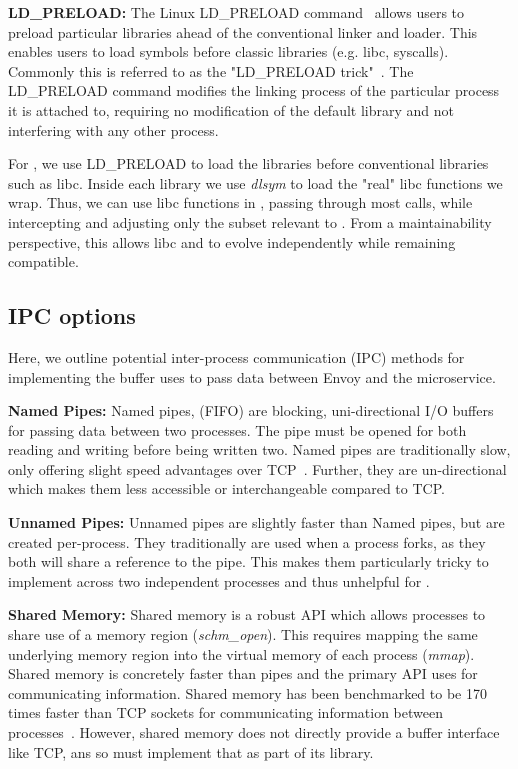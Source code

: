 \textbf{LD\_PRELOAD:}
The Linux LD\_PRELOAD command~\cite{ldpreload} allows users to preload particular libraries ahead of the conventional linker and loader.
This enables users to load symbols before classic libraries (e.g. libc, syscalls).
Commonly this is referred to as the "LD\_PRELOAD trick"~\cite{ldtrick}.
The LD\_PRELOAD command modifies the linking process of the particular process it is attached to, requiring no modification of the default library and not interfering with any other process.


For \sysname, we use LD\_PRELOAD to load the \sysname libraries before conventional libraries such as libc.
Inside each \sysname library we use \textit{dlsym} to load the "real" libc functions we wrap.
Thus, we can use libc functions in \sysname, passing through most calls, while intercepting and adjusting only the subset relevant to \sysname.
From a maintainability perspective, this allows libc and \sysname to evolve independently while remaining compatible.

\subsection{IPC options}
Here, we outline potential inter-process communication (IPC) methods for implementing the buffer \sysname uses to pass data between Envoy and the microservice.

\textbf{Named Pipes:}
Named pipes, (FIFO) are blocking, uni-directional I/O buffers for passing data between two processes.
The pipe must be opened for both reading and writing before being written two.
Named pipes are traditionally slow, only offering slight speed advantages over TCP~\cite{ipcperf}.
Further, they are un-directional which makes them less accessible or interchangeable compared to TCP.

\textbf{Unnamed Pipes:}
Unnamed pipes are slightly faster than Named pipes, but are created per-process.
They traditionally are used when a process forks, as they both will share a reference to the pipe.
This makes them particularly tricky to implement across two independent processes and thus unhelpful for \sysname.

\textbf{Shared Memory:}
Shared memory is a robust API which allows processes to share use of a memory region (\textit{schm\_open}).
This requires mapping the same underlying memory region into the virtual memory of each process (\textit{mmap}).
Shared memory is concretely faster than pipes and the primary API \sysname uses for communicating information.
Shared memory has been benchmarked to be 170 times faster than TCP sockets for communicating information between processes~\cite{ipcperf}.
However, shared memory does not directly provide a buffer interface like TCP, ans so \sysname must implement that as part of its library.

